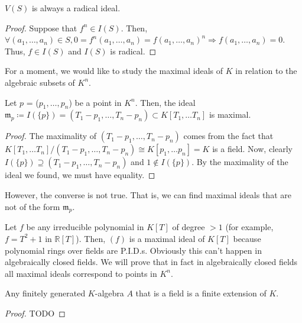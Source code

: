 \begin{prop}
    $V(S)$ is always a radical ideal.
    \begin{proof}
        Suppose that $f^n \in I(S).$
        Then,
        $\forall (a_1, \ldots, a_n) \in S, 0 = f^n(a_1, \ldots, a_n)
        = f(a_1, \ldots, a_n)^n \Rightarrow f(a_1, \ldots, a_n) = 0$.
        Thus, $f \in I(S)$ and $I(S)$ is radical.
    \end{proof}
\end{prop}

For a moment, we would like to study the maximal ideals of $K$ in relation to the algebraic subsets of $K^n$.

\begin{prop}
    Let $p$ = ($p_1, \ldots, p_n$) be a point in $K^n$.
    Then, the ideal $\mathfrak{m}_p \coloneqq I(\{p\})
    = (T_1 - p_1, \ldots, T_n - p_n) \subset K[T_1, \ldots T_n]$
    is maximal.

    \begin{proof}
        The maximality of $(T_1 - p_1, \ldots, T_n - p_n)$
        comes from the fact that $K[T_1, \ldots T_n]/(T_1 - p_1, \ldots, T_n - p_n) \cong K[p_1, \ldots p_n] = K$
        is a field.
        Now, clearly
        $I(\{p\}) \supseteq (T_1 - p_1, \ldots, T_n - p_n)$
        and
        $1 \notin I(\{p\})$.
        By the maximality of the ideal we found, we must have equality.

    \end{proof}

\end{prop}

\begin{rk}
    However, the converse is not true.
    That is, we can find maximal ideals that are not of the form $\mathfrak{m}_p$.
\end{rk}

\begin{example}
    Let $f$ be any irreducible polynomial in $K[T]$
    of degree $> 1$ (for example, $f = T^2 + 1$ in $\mathbb{R}[T]$).
    Then, $(f)$ is a maximal ideal of $K[T]$ because
    polynomial rings over fields are P.I.D.s.
    Obviously this can't happen in algebraically closed fields.
    We will prove that in fact in algebraically closed fields
    all maximal ideals correspond to points in $K^n$.
\end{example}

\begin{theorem}
    Any finitely generated $K$-algebra $A$ that is a field is a finite extension of $K$.
    \begin{proof}
        TODO
    \end{proof}
\end{theorem}

